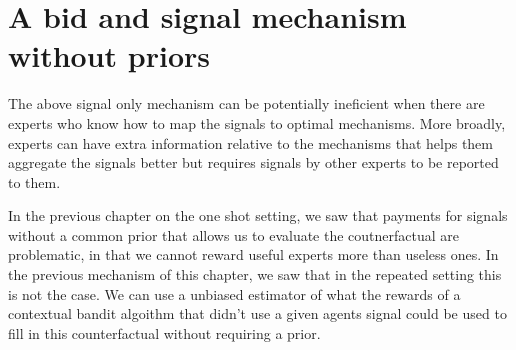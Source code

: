

	




\section{A bid and signal mechanism without priors}



The above signal only mechanism can be potentially ineficient when there are experts who know how to map the signals to optimal mechanisms. More broadly, experts can have extra information relative to the mechanisms that helps them aggregate the signals better but requires signals by other experts to be reported to them. 

In the previous chapter on the one shot setting, we saw that payments for  signals without a common prior that allows us to evaluate the coutnerfactual are problematic, in that we cannot reward useful experts more than useless ones. In the previous mechanism of this chapter, we saw that in the repeated setting this is not the case. We can use a unbiased estimator of what the rewards of a contextual bandit algoithm that didn't use a given agents signal could be used to fill in this counterfactual without requiring a prior.

